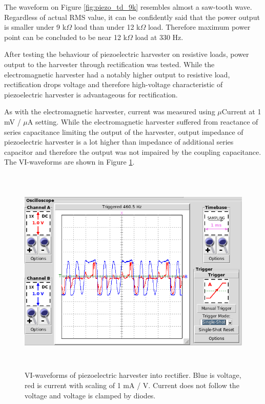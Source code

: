 The waveform on Figure \ref{fig:piezo_td_9k} resembles almost a saw-tooth wave. Regardless of actual RMS value, it can be confidently said that the power output is smaller under 9 k$\Omega$ load than under 12 k$\Omega$ load. Therefore maximum power point can be concluded to be near 12 k$\Omega$ load at 330 Hz. 

After testing the behaviour of piezoelectric harvester on resistive loads, power output to the harvester through rectification was tested. While the electromagnetic harvester had a notably higher output to resistive load, rectification drops voltage and therefore high-voltage characteristic of piezoelectric harvester is advantageous for rectification. 

As with the electromagnetic harvester, current was measured using $\mu$Current at 1 mV / $\mu$A setting. While the electromagnetic harvester suffered from reactance of series capacitance limiting the output of the harvester, output impedance of piezoelectric harvester is a lot higher than impedance of additional series capacitor and therefore the output was not impaired by the coupling capacitance. The VI-waveforms are shown in Figure \ref{fig:piezo_td_vi}. 

\begin{figure}[htb]
\begin{center}
\includegraphics[height=10cm]{images/own_measurement/generator_shaker/piezo_td_vi_330hz_2_3.png}
\end{center}
\caption{\label{fig:piezo_td_vi} VI-waveforms of piezoelectric harvester into rectifier. Blue is voltage, red is current with scaling of 1 mA / V. Current does not follow the voltage and voltage is clamped by diodes.}
\end{figure}


